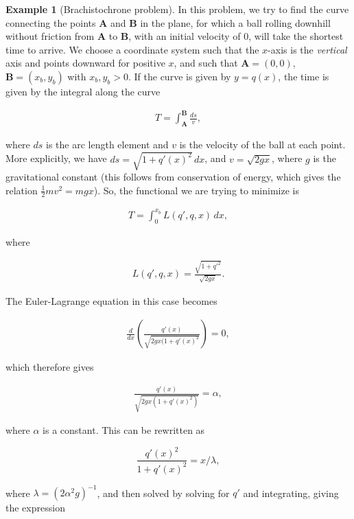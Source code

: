 \documentclass[11pt]{report}
\theoremstyle{plain}
\theoremstyle{definition}
\newtheorem{example}[thm]{Example}
\begin{document}
\begin{example}[Brachistochrone problem]
In this problem, we try to find the curve connecting
the points $\mathbf{A}$ and $\mathbf{B}$ in the plane,
for which a ball rolling downhill without friction
from $\mathbf{A}$ to $\mathbf{B}$, with an initial
velocity of $0$, will take the shortest time to
arrive. We choose a coordinate system such that the
$x$-axis is the \emph{vertical} axis and points downward
for positive $x$, and such that $\mathbf{A}=(0,0)$,
$\mathbf{B}=(x_b,y_b)$ with $x_b,y_b>0$. If the curve
is given by $y=q(x)$, the time is given by the
integral along the curve

\begin{align*}
T = \int_{\mathbf{A}}^{\mathbf{B}} \frac{ds}{v},
\end{align*}

\noindent where $ds$ is the arc length element and $v$ is the
velocity of the ball at each point. More explicitly,
we have $ds = \sqrt{1+q'(x)^2}\,dx$, and
$v=\sqrt{2g x}$, where $g$ is the gravitational
constant (this follows from conservation of energy,
which gives the relation $\tfrac12 m v^2 = mgx$). So,
the functional we are trying to minimize is

\begin{align*}
T = \int_0^{x_b} L(q',q,x)\,dx,
\end{align*}

\noindent where

\begin{align*}
L(q',q,x) = \frac{\sqrt{1+q'^2}}{\sqrt{2g x}}.
\end{align*}

\noindent The Euler-Lagrange equation in this case becomes

\begin{align*}
\frac{d}{dx}\left(\frac{q'(x)}{\sqrt{2 g x(1+q'(x)^2}}\right) = 0,
\end{align*}

\noindent which therefore gives

\begin{align*}
\frac{q'(x)}{\sqrt{2 g x(1+q'(x)^2)}} = \alpha,
\end{align*}

\noindent where $\alpha$ is a constant. This can be rewritten as

\[
\frac{q'(x)^2}{1+q'(x)^2} = x/\lambda,
\]

\noindent where $\lambda=(2\alpha^2 g)^{-1}$, and then solved by
solving for $q'$ and integrating, giving the
expression


\end{example}
\end{document}
